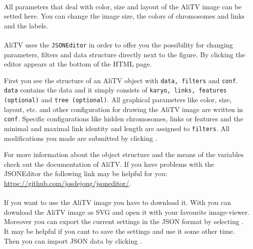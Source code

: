 \documentclass[a4paper]{scrartcl}
\begin{document}
\paragraph*{}
All parameters that deal with color, size and layout of the AliTV image can be setted here. You can change the image size, the colors of chromosomes and links and the labels.

\paragraph*{}
AliTV uses the \texttt{JSONEditor} in order to offer you the possibility for changing parameters, filters and data structure directly next to the figure. By clicking  the editor appears at the bottom of the HTML page. 

First you see the structure of an AliTV object with \texttt{data, filters} and \texttt{conf}. \texttt{data} contains the data and it simply consists of \texttt{karyo, links, features (optional)} and  \texttt{tree (optional)}. All graphical parameters like color, size, layout, etc. and other configuration for drawing the AliTV image are written in \texttt{conf}. Specific configurations like hidden chromosomes, links or features and the minimal and maximal link identity and length are assigned to \texttt{filters}. All modifications you made are submitted by clicking .

For more information about the object structure and the means of the variables check out the documentation of AliTV. If you have problems with the JSONEditor the following link may be helpful for you: \url{https://github.com/josdejong/jsoneditor/}.

\paragraph*{}
If you want to use the AliTV image you have to download it. With  you can download the AliTV image as SVG and open it with your favourite image-viewer. Moreover you can export the current settings in the JSON format by selecting . It may be helpful if you cant to save the settings and use it some other time. Then you can import JSON data by clicking .
\end{document}

